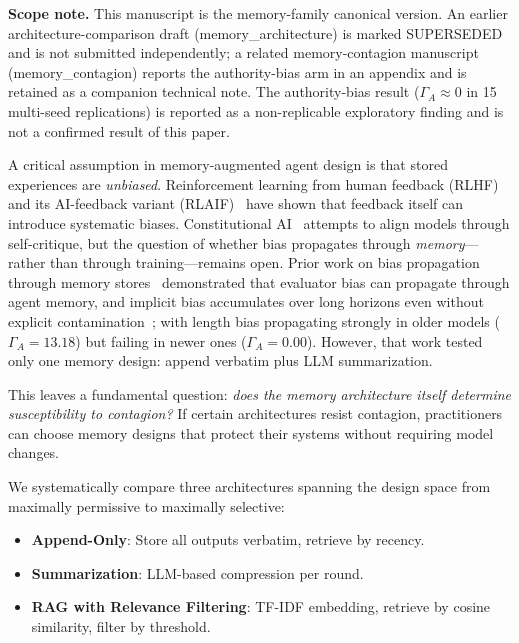 \documentclass[11pt]{article}
\begin{document}
\textbf{Scope note.} This manuscript is the memory-family canonical version. An earlier architecture-comparison draft (memory\_architecture) is marked SUPERSEDED and is not submitted independently; a related memory-contagion manuscript (memory\_contagion) reports the authority-bias arm in an appendix and is retained as a companion technical note. The authority-bias result ($\Gamma_A \approx 0$ in 15 multi-seed replications) is reported as a non-replicable exploratory finding and is not a confirmed result of this paper.

A critical assumption in memory-augmented agent design is that stored experiences are \emph{unbiased}. Reinforcement learning from human feedback (RLHF)~\cite{christiano2017deep,ouyang2022training} and its AI-feedback variant (RLAIF)~\cite{lee2023rlaif} have shown that feedback itself can introduce systematic biases. Constitutional AI~\cite{bai2022constitutional} attempts to align models through self-critique, but the question of whether bias propagates through \emph{memory}---rather than through training---remains open. Prior work on bias propagation through memory stores~\cite{bertalanic2026cost,huang2026cagecal,ma2026implicitbias} demonstrated that evaluator bias can propagate through agent memory, and implicit bias accumulates over long horizons even without explicit contamination~\cite{ma2026implicitbias}; with length bias propagating strongly in older models ($\Gamma_A = 13.18$) but failing in newer ones ($\Gamma_A = 0.00$). However, that work tested only one memory design: append verbatim plus LLM summarization.

This leaves a fundamental question: \emph{does the memory architecture itself determine susceptibility to contagion?} If certain architectures resist contagion, practitioners can choose memory designs that protect their systems without requiring model changes.

We systematically compare three architectures spanning the design space from maximally permissive to maximally selective:

\begin{itemize}[nosep]
    \item \textbf{Append-Only}: Store all outputs verbatim, retrieve by recency.
    \item \textbf{Summarization}: LLM-based compression per round.
    \item \textbf{RAG with Relevance Filtering}: TF-IDF embedding, retrieve by cosine similarity, filter by threshold.
\end{itemize}
\end{document}
